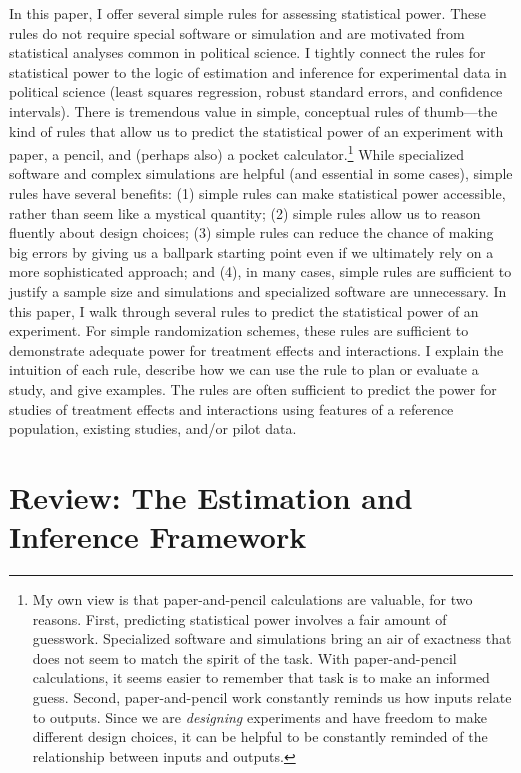 \documentclass[12pt]{article}
\begin{document}
In this paper, I offer several simple rules for assessing statistical power. 
These rules do not require special software or simulation and are motivated from statistical analyses common in political science. 
I tightly connect the rules for statistical power to the logic of estimation and inference for experimental data in political science (least squares regression, robust standard errors, and confidence intervals).
There is tremendous value in simple, conceptual rules of thumb---the kind of rules that allow us to predict the statistical power of an experiment with paper, a pencil, and (perhaps also) a pocket calculator.\footnote{
  My own view is that paper-and-pencil calculations are valuable, for two reasons. 
  First, predicting statistical power involves a fair amount of guesswork. 
  Specialized software and simulations bring an air of exactness that does not seem to match the spirit of the task. 
  With paper-and-pencil calculations, it seems easier to remember that task is to make an informed guess. 
  Second, paper-and-pencil work constantly reminds us how inputs relate to outputs. 
  Since we are \emph{designing} experiments and have freedom to make different design choices, it can be helpful to be constantly reminded of the relationship between inputs and outputs.
  }
While specialized software and complex simulations are helpful (and essential in some cases), simple rules have several benefits: 
(1) simple rules can make statistical power accessible, rather than seem like a mystical quantity; 
(2) simple rules allow us to reason fluently about design choices; 
(3) simple rules can reduce the chance of making big errors by giving us a ballpark starting point even if we ultimately rely on a more sophisticated approach; and
(4), in many cases, simple rules are sufficient to justify a sample size and simulations and specialized software are unnecessary. 
In this paper, I walk through several rules to predict the statistical power of an experiment. 
For simple randomization schemes, these rules are sufficient to demonstrate adequate power for treatment effects and interactions.
I explain the intuition of each rule, describe how we can use the rule to plan or evaluate a study, and give examples.
The rules are often sufficient to predict the power for studies of treatment effects and interactions using features of a reference population, existing studies, and/or pilot data.

\section*{Review: The Estimation and Inference Framework}
\end{document}
